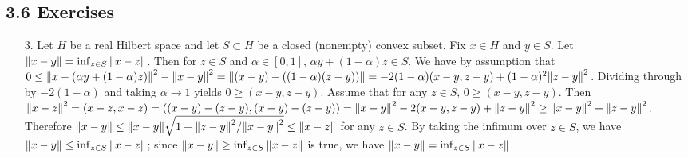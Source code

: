 \documentclass[11pt,leqno]{article}
\theoremstyle{plain}
\theoremstyle{definition}
\numberwithin{equation}{section}
\numberwithin{lem}{section}
\begin{document}
\subsection*{3.6 Exercises}
\begin{enumerate}
    \item[3.] Let $H$ be a real Hilbert space and let $S\subset H$ be a closed (nonempty) convex subset. Fix $x\in H$ and $y\in S$.
    Let $\norm{x-y} = \inf_{z\in S}\norm{x-z}$. Then for $z\in S$ and $\alpha\in[0,1]$, $\alpha y + (1-\alpha)z\in S$. We have by assumption that $0\leq \norm{x-(\alpha y + (1-\alpha)z)}^2 - \norm{x-y}^2 = \norm{(x-y)-((1-\alpha)(z-y))} = -2(1-\alpha)(x-y,z-y) + (1-\alpha)^2\norm{z-y}^2$. Dividing through by $-2(1-\alpha)$ and taking $\alpha\to 1$ yields $0\geq (x-y,z-y)$.
    Assume that for any $z\in S$, $0\geq (x-y,z-y)$. Then $\norm{x-z}^2 = (x-z,x-z) = ((x-y)-(z-y),(x-y)-(z-y)) = \norm{x-y}^2 -2(x-y,z-y) + \norm{z-y}^2\geq \norm{x-y}^2 + \norm{z-y}^2$. Therefore $\norm{x-y}\leq \norm{x-y}\sqrt{1+\norm{z-y}^2/\norm{x-y}^2}\leq \norm{x-z}$ for any $z\in S$. By taking the infimum over $z\in S$, we have $\norm{x-y} \leq \inf_{z\in S}\norm{x-z}$; since $\norm{x-y} \geq \inf_{z\in S}\norm{x-z}$ is true, we have $\norm{x-y} = \inf_{z\in S}\norm{x-z}$.
\end{enumerate}
\end{document}
